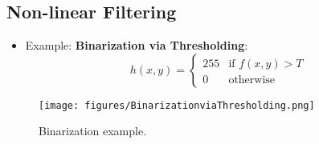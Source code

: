 \subsection{Non-linear Filtering}
\begin{itemize}
    \item Example: \textbf{Binarization via Thresholding}:
    $$
    h(x,y) = 
    \begin{cases} 
    255 & \text{if } f(x,y) > T \\
    0   & \text{otherwise}
    \end{cases}
    $$
\end{itemize}

\begin{figure}[htbp]
    \centering
    \texttt{[image: figures/BinarizationviaThresholding.png]}
    \caption{Binarization example.}
\end{figure}